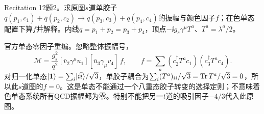 \begin{exercise}\label{ex:rec-12-2}
Recitation 12题2。求原图$s$道单胶子$q(p_1,c_1)+\bar q(p_2,c_2)\to q(p_3,c_3)+\bar q(p_4,c_4)$的振幅与颜色因子$f$；在色单态配置下算$f$并解释。内线$q=p_1+p_2=p_3+p_4$，顶点$-\ii g_s\gamma^\mu T^a$、$T^a=\lambda^a/2$。
\begin{center}\end{center}
\end{exercise}
\begin{solution}
官方单态零因子重编。忽略整体振幅号，
\begin{equation}
 \mathcal M=\frac{g_s^2}{q^2}
 [\bar v_2\gamma^\mu u_1][\bar u_3\gamma_\mu v_4]\,f,\qquad
 f=\sum_a(c_2^\dagger T^ac_1)(c_3^\dagger T^ac_4).
\end{equation}
对归一化单态$\lvert \mathbf1\rangle=\sum_i\lvert i\bar i\rangle/\sqrt3$，单胶子耦合为$\sum_i(T^a)_{ii}/\sqrt3=\operatorname{Tr} T^a/\sqrt3=0$，所以此$s$道图的$f=0$。这是单态不能通过一个八重态胶子转变的选择定则；不意味着色单态系统所有QCD振幅都为零。特别不能把另一$t$道的吸引因子$-4/3$代入此原图。
\end{solution}
